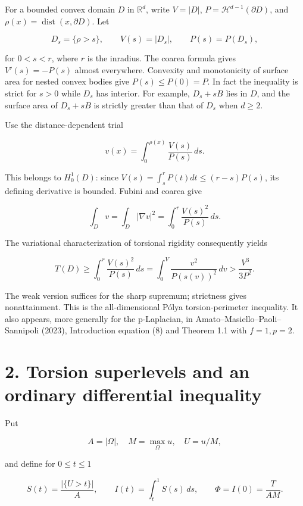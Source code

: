 \documentclass[11pt,a4paper]{article}
\begin{document}
For a bounded convex domain \(D\) in \(\mathbb R^d\), write \(V=|D|\),
\(P=\mathcal H^{d-1}(\partial D)\), and
\(\rho(x)=\operatorname{dist}(x,\partial D)\). Let

\[
 D_s=\{\rho>s\},\qquad V(s)=|D_s|,\qquad P(s)=P(D_s),
\]

for \(0<s<r\), where \(r\) is the inradius. The coarea formula gives
\(V'(s)=-P(s)\) almost everywhere. Convexity and monotonicity of surface
area for nested convex bodies give \(P(s)\le P(0)=P\). In fact the
inequality is strict for \(s>0\) while \(D_s\) has interior. For
example, \(D_s+sB\) lies in \(D\), and the surface area of \(D_s+sB\) is
strictly greater than that of \(D_s\) when \(d\ge 2\).

Use the distance-dependent trial

\[
 v(x)=\int_0^{\rho(x)}\frac{V(s)}{P(s)}\,ds.
\]

This belongs to \(H^1_0(D)\): since
\(V(s)=\int _s^r P(t)dt \le (r-s)P(s)\), its defining derivative is
bounded. Fubini and coarea give

\[
 \int_D v=\int_D|\nabla v|^2
  =\int_0^r\frac{V(s)^2}{P(s)}\,ds.
\]

The variational characterization of torsional rigidity consequently
yields

\[
 T(D)\ge\int_0^r\frac{V(s)^2}{P(s)}\,ds
       =\int_0^{V}\frac{v^2}{P(s(v))^2}\,dv
       >\frac{V^3}{3P^2}.
 \tag{1}
\]

The weak version suffices for the sharp supremum; strictness gives
nonattainment. This is the all-dimensional Pólya torsion-perimeter
inequality. It also appears, more generally for the p-Laplacian, in
Amato--Masiello--Paoli--Sannipoli (2023), Introduction equation (8) and
Theorem 1.1 with \(f=1,p=2\).

\hypertarget{1028-torsion-superlevels-and-an-ordinary-differential-inequality}{%
\section{2. Torsion superlevels and an ordinary differential
inequality}\label{1028-torsion-superlevels-and-an-ordinary-differential-inequality}}

Put

\[
 A=|\Omega|,\quad M=\max_\Omega u,\quad U=u/M,
\]

and define for \(0\le t\le 1\)

\[
 S(t)=\frac{|\{U>t\}|}{A},\qquad
 I(t)=\int_t^1 S(s)\,ds,\qquad
 \Phi=I(0)=\frac{T}{AM}.
 \tag{2}
\]
\end{document}
